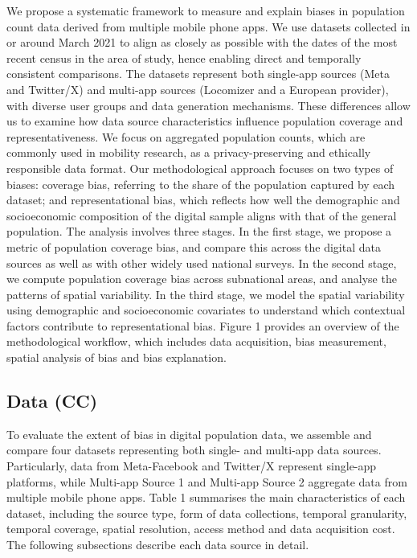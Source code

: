 \documentclass[]{rsos}%
\begin{document}
We propose a systematic framework to measure and explain biases in population count data derived from multiple mobile phone apps. We use datasets collected in or around March 2021 to align as closely as possible with the dates of the most recent census in the area of study, hence enabling direct and temporally consistent comparisons. The datasets represent both single-app sources (Meta and Twitter/X) and multi-app sources (Locomizer and a European provider), with diverse user groups and data generation mechanisms. These differences allow us to examine how data source characteristics influence population coverage and representativeness. We focus on aggregated population counts, which are commonly used in mobility research, as a privacy-preserving and ethically responsible data format. Our methodological approach focuses on two types of biases: coverage bias, referring to the share of the population captured by each dataset; and representational bias, which reflects how well the demographic and socioeconomic composition of the digital sample aligns with that of the general population. The analysis involves three stages. In the first stage, we propose a metric of population coverage bias, and compare this across the digital data sources as well as with other widely used national surveys. In the second stage, we compute population coverage bias across subnational areas, and analyse the patterns of spatial variability. In the third stage, we model the spatial variability using demographic and socioeconomic covariates to understand which contextual factors contribute to representational bias. Figure 1 provides an overview of the methodological workflow, which includes data acquisition, bias measurement, spatial analysis of bias and bias explanation.

\subsection{Data (CC)}\label{data-cc}

To evaluate the extent of bias in digital population data, we assemble and compare four datasets representing both single- and multi-app data sources. Particularly, data from Meta-Facebook and Twitter/X represent single-app platforms, while Multi-app Source 1 and Multi-app Source 2 aggregate data from multiple mobile phone apps. Table 1 summarises the main characteristics of each dataset, including the source type, form of data collections, temporal granularity, temporal coverage, spatial resolution, access method and data acquisition cost. The following subsections describe each data source in detail.
\end{document}
